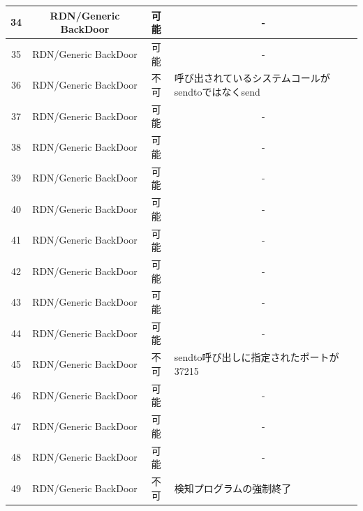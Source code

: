 \begin{small}
\begin{longtable}{|c|c|c|l|}
        34 & RDN/Generic BackDoor & 可能    & \multicolumn{1}{c|}{-}                             \\ \hline
        35 & RDN/Generic BackDoor & 可能    & \multicolumn{1}{c|}{-}                             \\ \hline
        36 & RDN/Generic BackDoor & 不可    & 呼び出されているシステムコールがsendtoではなくsend       \\ \hline
        37 & RDN/Generic BackDoor & 可能    & \multicolumn{1}{c|}{-}                             \\ \hline
        38 & RDN/Generic BackDoor & 可能    & \multicolumn{1}{c|}{-}                             \\ \hline
        39 & RDN/Generic BackDoor & 可能    & \multicolumn{1}{c|}{-}                             \\ \hline
        40 & RDN/Generic BackDoor & 可能    & \multicolumn{1}{c|}{-}                             \\ \hline
        41 & RDN/Generic BackDoor & 可能    & \multicolumn{1}{c|}{-}                             \\ \hline
        42 & RDN/Generic BackDoor & 可能    & \multicolumn{1}{c|}{-}                             \\ \hline
        43 & RDN/Generic BackDoor & 可能    & \multicolumn{1}{c|}{-}                             \\ \hline
        44 & RDN/Generic BackDoor & 可能    & \multicolumn{1}{c|}{-}                             \\ \hline
        45 & RDN/Generic BackDoor & 不可    & sendto呼び出しに指定されたポートが37215      \\ \hline
        46 & RDN/Generic BackDoor & 可能    & \multicolumn{1}{c|}{-}                             \\ \hline
        47 & RDN/Generic BackDoor & 可能    & \multicolumn{1}{c|}{-}                             \\ \hline
        48 & RDN/Generic BackDoor & 可能    & \multicolumn{1}{c|}{-}                             \\ \hline
        49 & RDN/Generic BackDoor & 不可    & 検知プログラムの強制終了                  \\ \hline
    
\end{longtable}
\end{small}

